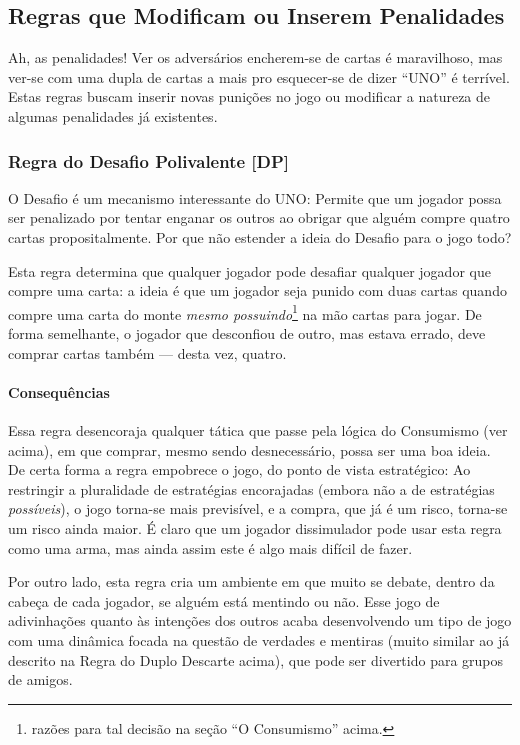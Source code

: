 \subsection{Regras que Modificam ou Inserem Penalidades}

Ah, as penalidades! Ver os adversários encherem-se de cartas é maravilhoso, mas ver-se com uma dupla de cartas a mais pro esquecer-se de dizer ``UNO'' é terrível. Estas regras buscam inserir novas punições no jogo ou modificar a natureza de algumas penalidades já existentes.

\subsubsection{Regra do Desafio Polivalente [DP]}

O Desafio é um mecanismo interessante do UNO: Permite que um jogador possa ser penalizado por tentar enganar os outros ao obrigar que alguém compre quatro cartas propositalmente. Por que não estender a ideia do Desafio para o jogo todo?

Esta regra determina que qualquer jogador pode desafiar qualquer jogador que compre uma carta: a ideia é que um jogador seja punido com duas cartas quando compre uma carta do monte \emph{mesmo possuindo}\footnote{razões para tal decisão na seção ``O Consumismo'' acima.} na mão cartas para jogar. De forma semelhante, o jogador que desconfiou de outro, mas estava errado, deve comprar cartas também --- desta vez, quatro.

\paragraph{Consequências}

Essa regra desencoraja qualquer tática que passe pela lógica do Consumismo (ver acima), em que comprar, mesmo sendo desnecessário, possa ser uma boa ideia. De certa forma a regra empobrece o jogo, do ponto de vista estratégico: Ao restringir a pluralidade de estratégias encorajadas (embora não a de estratégias \emph{possíveis}), o jogo torna-se mais previsível, e a compra, que já é um risco, torna-se um risco ainda maior. É claro que um jogador dissimulador pode usar esta regra como uma arma, mas ainda assim este é algo mais difícil de fazer.

Por outro lado, esta regra cria um ambiente em que muito se debate, dentro da cabeça de cada jogador, se alguém está mentindo ou não. Esse jogo de adivinhações quanto às intenções dos outros acaba desenvolvendo um tipo de jogo com uma dinâmica focada na questão de verdades e mentiras (muito similar ao já descrito na Regra do Duplo Descarte acima), que pode ser divertido para grupos de amigos.

